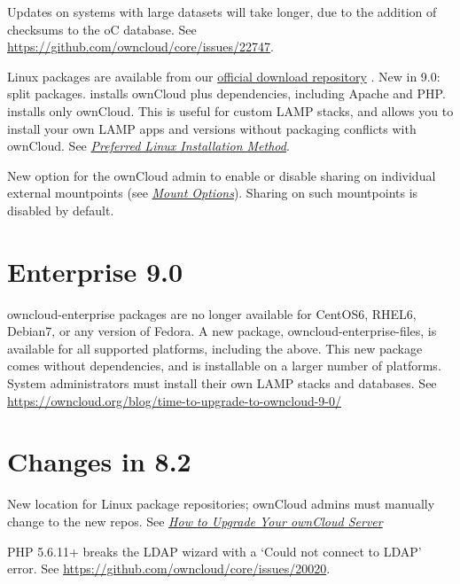 \documentclass[letterpaper,10pt,english]{sphinxmanual}
\begin{document}
Updates on systems with large datasets will take longer, due to the addition of checksums to the
oC database. See \href{https://github.com/owncloud/core/issues/22747}{https://github.com/owncloud/core/issues/22747}.

Linux packages are available from our \href{https://download.owncloud.org/download/repositories/stable/owncloud/}{official download repository} .
New in 9.0: split packages.  installs ownCloud plus dependencies, including Apache
and PHP.  installs only ownCloud. This is useful for custom LAMP stacks, and
allows you to install your own LAMP apps and versions without packaging conflicts with ownCloud.
See {\hyperref[installation/linux_installation::doc]{\emph{\emph{Preferred Linux Installation Method}}}}.

New option for the ownCloud admin to enable or disable sharing on individual external mountpoints
(see {\hyperref[configuration_files/external_storage_configuration_gui:external\string-storage\string-mount\string-options\string-label]{\emph{Mount Options}}}). Sharing on such mountpoints is disabled by default.


\section{Enterprise 9.0}
\label{release_notes:enterprise-9-0}
owncloud-enterprise packages are no longer available for CentOS6, RHEL6,
Debian7, or any version of Fedora. A new package, owncloud-enterprise-files, is available for all supported platforms, including the above. This new package comes without dependencies, and is installable on a larger number of platforms. System administrators must install their own LAMP stacks and databases. See \href{https://owncloud.org/blog/time-to-upgrade-to-owncloud-9-0/}{https://owncloud.org/blog/time-to-upgrade-to-owncloud-9-0/}


\section{Changes in 8.2}
\label{release_notes:changes-in-8-2}
New location for Linux package repositories; ownCloud admins must manually
change to the new repos. See {\hyperref[maintenance/upgrade::doc]{\emph{\emph{How to Upgrade Your ownCloud Server}}}}

PHP 5.6.11+ breaks the LDAP wizard with a `Could not connect to LDAP' error. See \href{https://github.com/owncloud/core/issues/20020}{https://github.com/owncloud/core/issues/20020}.
\end{document}
